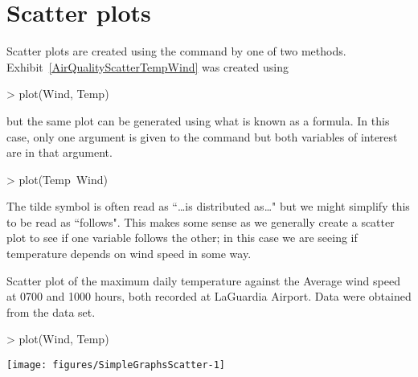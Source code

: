 \section{Scatter plots} 
 
Scatter plots are created using the  command by one of two methods. Exhibit~\ref{AirQualityScatterTempWind} was created using 

\begin{Schunk}
\begin{Sinput}
> plot(Wind, Temp) 
\end{Sinput}
\end{Schunk}

but the same plot can be generated using what is known as a formula. In this case, only one argument is given to the  command but both variables of interest are in that argument. 

\begin{Schunk}
\begin{Sinput}
> plot(Temp~Wind) 
\end{Sinput}
\end{Schunk}

The tilde symbol is often read as ``\ldots is distributed as\ldots" but we might simplify this to be read as ``follows". This makes some sense as we generally create a scatter plot to see if one variable follows the other; in this case we are seeing if temperature depends on wind speed in some way. 
 
\begin{exhibit} 
\begin{center} 
\caption{Scatter plot of the maximum daily temperature against the Average wind speed at 0700 and 1000 hours, both recorded at LaGuardia Airport. Data were obtained from the  data set.} 
\label{AirQualityScatterTempWind} 

\begin{Schunk}
\begin{Sinput}
> plot(Wind, Temp) 
\end{Sinput}

\texttt{[image: figures/SimpleGraphsScatter-1]} \end{Schunk}

\end{center} 
\end{exhibit} 
 
